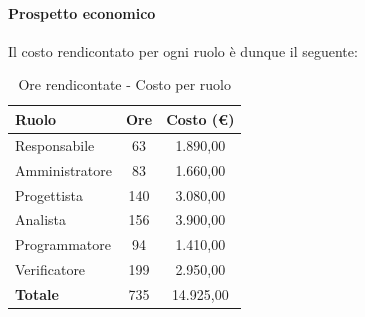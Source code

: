 \documentclass[../PianoProgetto.tex]{subfiles}
\begin{document}
\vfill
	
	\paragraph{Prospetto economico}
					Il costo rendicontato per ogni ruolo è dunque il seguente:
	\begin{table}[h]
		\centering
		\begin{tabular}{l * {2}{c}}
			\toprule
			\textbf{Ruolo} & \textbf{Ore} & \textbf{Costo (\euro{})} \\
			\midrule
			Responsabile &	63 & 1.890,00 \\
			Amministratore & 83 & 1.660,00 \\
			Progettista & 140 & 3.080,00 \\
			Analista & 156 & 3.900,00 \\
			Programmatore & 94 & 1.410,00 \\
			Verificatore & 199 & 2.950,00 \\
			\midrule		
			\textbf{Totale} & 735 & 14.925,00 \\
			\bottomrule
		\end{tabular}
		\caption{Ore rendicontate - Costo per ruolo}
		\label{tab:rendicontate_costo}
	\end{table}
\vfill
\newpage
\vfill	
	
\end{document}
